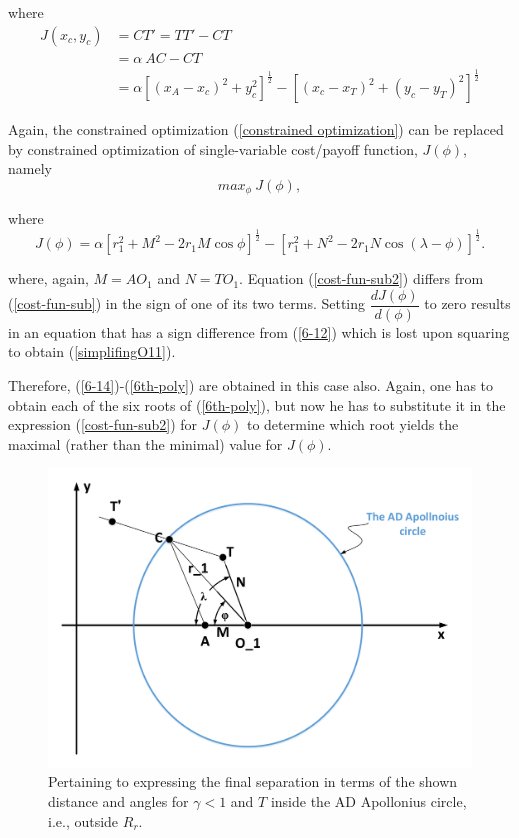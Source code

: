 where
\begin{equation}
\begin{split}
J(x_c,y_c) &= CT' = TT' - CT \\
&=\alpha\ AC - CT \\
&=\alpha [(x_A-x_c)^2 + y_c^2]^{\frac{1}{2}} 
- [(x_c - x_T)^2 + (y_c - y_T)^2]^{\frac{1}{2}}
\end{split}
\end{equation}

Again, the constrained optimization (\ref{constrained optimization}) can be replaced by constrained optimization of single-variable cost/payoff function, $J(\phi)$, namely
\begin{equation}
max_{\phi}\ J(\phi),
\end{equation}

where 
\begin{equation}
J(\phi) = \alpha [r_1^2 + M^2 - 2 r_1 M \cos\phi]^\frac{1}{2} - [r_1^2 + N^2 - 2 r_1 N \cos(\lambda-\phi)]^\frac{1}{2}.
\label{cost-fun-sub2}
\end{equation}

where, again, $M=AO_1$ and $N=TO_1$. Equation (\ref{cost-fun-sub2}) differs from (\ref{cost-fun-sub}) in the sign of one of its two terms. Setting $\dfrac{dJ(\phi)}{d(\phi)}$ to zero results in an equation that has a sign difference from (\ref{6-12}) which is lost upon squaring to obtain (\ref{simplifingO11}).

Therefore, (\ref{6-14})-(\ref{6th-poly}) are obtained in this case also.
Again, one has to obtain each of the six roots of (\ref{6th-poly}), but now he has to substitute it in the expression (\ref{cost-fun-sub2}) for $J(\phi)$ to determine which root yields the maximal (rather than the minimal) value for $J(\phi)$. 
\begin{figure}[H]
\centering
\includegraphics[width=1.0\textwidth]{fig/Drawing6_2.pdf}
\caption{Pertaining to expressing the final separation in terms of the shown distance and angles for $\gamma<1$ and $T$ inside the AD Apollonius circle, i.e., outside $R_r$.}
\label{6.2}
\end{figure}



